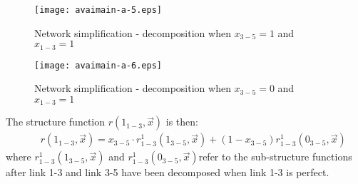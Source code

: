 \begin{figure}[h]
\texttt{[image: avaimain-a-5.eps]}
\caption{Network simplification - decomposition when $x_{3-5}=1$ and $x_{1-3}=1$}\label{figavaimain-a:5}
\end{figure}

\begin{figure}[h]
\texttt{[image: avaimain-a-6.eps]}
\caption{Network simplification - decomposition when $x_{3-5}=0$ and $x_{1-3}=1$}\label{figavaimain-a:6}
\end{figure}

The structure function $r({1_{1 - 3}},\vec x)$ is then:
\begin{eqnarray}
&& r({1_{1 - 3}},\vec x) = {x_{3 - 5}} \cdot r_{1 - 3}^1({1_{3 - 5}},\vec x) + (1 -
{x_{3 - 5}})r_{1 - 3}^1({0_{3 - 5}},\vec x)
\label{eqavaimain:6}
\end{eqnarray}
where $r_{1 - 3}^1({1_{3 - 5}},\vec x)$ and $r_{1 - 3}^1({0_{3 -
5}},\vec x)$refer to the sub-structure functions after link 1-3 and link 3-5 have
been decomposed when link 1-3 is perfect.

